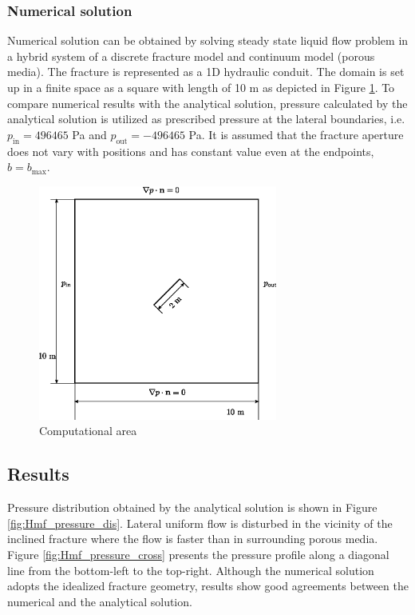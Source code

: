 \subsubsection{Numerical solution}
Numerical solution can be obtained by solving steady state liquid flow problem in a hybrid system of a discrete fracture model and continuum model (porous media). The fracture is represented as a 1D hydraulic conduit. The domain is set up in a finite space as a square with length of 10 m as depicted in Figure \ref{fig:Hmf_domain}. 
%
To compare numerical results with the analytical solution, pressure calculated by the analytical solution is utilized as prescribed pressure  at the lateral boundaries, i.e. $p_\mathrm{in}=496465$ Pa and $p_\mathrm{out}=-496465$ Pa. It is assumed that the fracture aperture does not vary with positions and has constant value even at the endpoints, $b=b_\mathrm{max}$.

\begin{figure}[htb]
\centering
\includegraphics[width=0.7\textwidth]{Chapter5/figure/Hmf_uniform_flow_domain}
\caption{Computational area}
\label{fig:Hmf_domain}
\end{figure}


\subsection{Results}

Pressure distribution obtained by the analytical solution is shown in Figure \ref{fig:Hmf_pressure_dis}. Lateral uniform flow is disturbed in the vicinity of the inclined fracture where the flow is faster than in surrounding porous media. 
%
Figure \ref{fig:Hmf_pressure_cross} presents the pressure profile along a diagonal line from the bottom-left to the top-right. Although the numerical solution adopts the idealized fracture geometry, results show  good agreements between the numerical and the analytical solution. 


